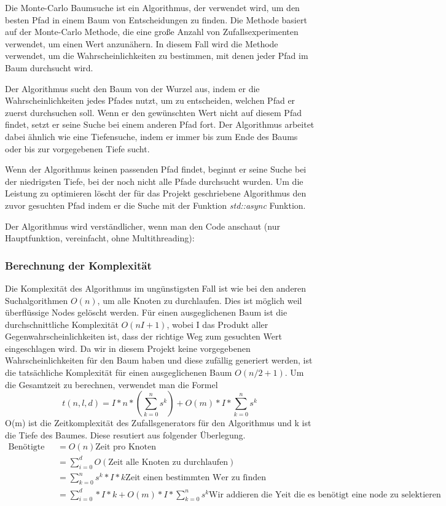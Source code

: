 \documentclass[a4paper,11pt]{article}
\begin{document}
Die Monte-Carlo Baumsuche ist ein Algorithmus, der verwendet wird, um den besten Pfad in einem Baum von Entscheidungen zu finden. Die Methode basiert auf der Monte-Carlo Methode, die eine große Anzahl von Zufallsexperimenten verwendet, um einen Wert anzunähern. In diesem Fall wird die Methode verwendet, um die Wahrscheinlichkeiten zu bestimmen, mit denen jeder Pfad im Baum durchsucht wird.

Der Algorithmus sucht den Baum von der Wurzel aus, indem er die Wahrscheinlichkeiten jedes Pfades nutzt, um zu entscheiden, welchen Pfad er zuerst durchsuchen soll. Wenn er den gewünschten Wert nicht auf diesem Pfad findet, setzt er seine Suche bei einem anderen Pfad fort. Der Algorithmus arbeitet dabei ähnlich wie eine Tiefensuche, indem er immer bis zum Ende des Baums oder bis zur vorgegebenen Tiefe sucht.

Wenn der Algorithmus keinen passenden Pfad findet, beginnt er seine Suche bei der niedrigsten Tiefe, bei der noch nicht alle Pfade durchsucht wurden. Um die Leistung zu optimieren löscht der für das Projekt geschriebene Algorithmus den zuvor gesuchten Pfad indem er die Suche mit der Funktion \emph{std::async} Funktion.

Der Algorithmus wird verständlicher, wenn man den Code anschaut (nur Hauptfunktion, vereinfacht, ohne Multithreading): 



\subsubsection{Berechnung der Komplexität}

Die Komplexität des Algorithmus im ungünstigsten Fall ist wie bei den anderen Suchalgorithmen $O(n)$, um alle Knoten zu durchlaufen. Dies ist möglich weil überflüssige Nodes gelöscht werden. Für einen ausgeglichenen Baum ist die durchschnittliche Komplexität $O(nI+1)$, wobei I das Produkt aller Gegenwahrscheinlichkeiten ist, dass der richtige Weg zum gesuchten Wert eingeschlagen wird. Da wir in diesem Projekt keine vorgegebenen Wahrscheinlichkeiten für den Baum haben und diese zufällig generiert werden, ist die tatsächliche Komplexität für einen ausgeglichenen Baum $O(n/2+1)$. 
Um die Gesamtzeit zu berechnen, verwendet man die Formel $$ t(n,l,d) = I*n*(\sum_{k=0}^{n} s^k) + O(m)*I*\sum_{k=0}^{n} s^k$$ O(m) ist die Zeitkomplexität des Zufallsgenerators für den Algorithmus und k ist die Tiefe des Baumes. Diese resutiert aus folgender Überlegung.
\begin{align}
  \text{Benötigte Zeit} &= O(n) \text{Zeit pro Knoten }  \\
  &= \sum_{i=0}^{d} O(\text{Zeit alle Knoten zu durchlaufen}) \\
  &= \sum_{k=0}^{n} s^k*I*k \text{Zeit einen bestimmten Wer zu finden} \\
  &= \sum_{i=0}^{d}*I*k+O(m)*I*\sum_{k=0}^{n} s^k \text{Wir addieren die Yeit die es benötigt eine node zu selektieren}\\
  \end{align}
\end{document}
